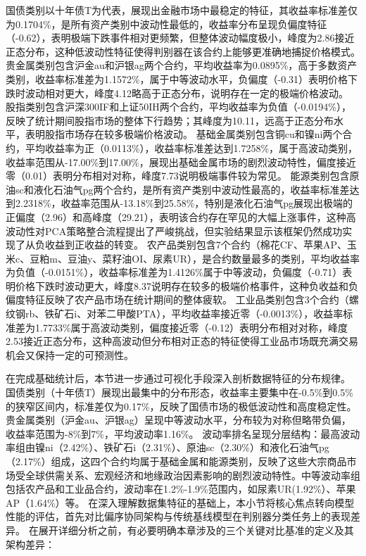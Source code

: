 国债类别以十年债T为代表，展现出金融市场中最稳定的特征，其收益率标准差仅为0.1704\%，是所有资产类别中波动性最低的，收益率分布呈现负偏度特征（-0.62），表明极端下跌事件相对更频繁，但整体波动幅度极小，峰度为2.86接近正态分布，这种低波动性特征使得判别器在该合约上能够更准确地捕捉价格模式。
贵金属类别包含沪金au和沪银ag两个合约，平均收益率为0.0895\%，高于多数资产类别，收益率标准差为1.1572\%，属于中等波动水平，负偏度（-0.31）表明价格下跌时波动相对更大，峰度4.12略高于正态分布，说明存在一定的极端价格波动。
股指类别包含沪深300IF和上证50IH两个合约，平均收益率为负值（-0.0194\%），反映了统计期间股指市场的整体下行趋势；其峰度为10.11，远高于正态分布水平，表明股指市场存在较多极端价格波动。
基础金属类别包含铜cu和镍ni两个合约，平均收益率为正（0.0113\%），收益率标准差达到1.7258\%，属于高波动类别，收益率范围从-17.00\%到17.00\%，展现出基础金属市场的剧烈波动特性，偏度接近零（0.01）表明分布相对对称，峰度7.73说明极端事件较为常见。
能源类别包含原油sc和液化石油气pg两个合约，是所有资产类别中波动性最高的，收益率标准差达到2.2318\%，收益率范围从-13.18\%到25.58\%，特别是液化石油气pg展现出极端的正偏度（2.96）和高峰度（29.21），表明该合约存在罕见的大幅上涨事件，这种高波动性对PCA策略整合流程提出了严峻挑战，但实验结果显示该框架仍然成功实现了从负收益到正收益的转变。
农产品类别包含7个合约（棉花CF、苹果AP、玉米c、豆粕m、豆油y、菜籽油OI、尿素UR），是合约数量最多的类别，平均收益率为负值（-0.0151\%），收益率标准差为1.4126\%属于中等波动，负偏度（-0.71）表明价格下跌时波动更大，峰度8.37说明存在较多的极端价格事件，这种负收益和负偏度特征反映了农产品市场在统计期间的整体疲软。
工业品类别包含3个合约（螺纹钢rb、铁矿石i、对苯二甲酸PTA），平均收益率接近零（-0.0013\%），收益率标准差为1.7733\%属于高波动类别，偏度接近零（-0.12）表明分布相对对称，峰度2.53接近正态分布，这种高波动但分布相对正态的特征使得工业品市场既充满交易机会又保持一定的可预测性。

在完成基础统计后，本节进一步通过可视化手段深入剖析数据特征的分布规律。
国债类别（十年债T）展现出最集中的分布形态，收益率主要集中在-0.5\%到0.5\%的狭窄区间内，标准差仅为0.17\%，反映了国债市场的极低波动性和高度稳定性。贵金属类别（沪金au、沪银ag）呈现中等波动水平，分布较为对称但略带负偏，收益率范围为-8\%到7\%，平均波动率1.16\%。
波动率排名呈现分层结构：最高波动率组由镍ni（2.42\%）、铁矿石i（2.31\%）、原油sc（2.30\%）和液化石油气pg（2.17\%）组成，这四个合约均属于基础金属和能源类别，反映了这些大宗商品市场受全球供需关系、宏观经济和地缘政治因素影响的剧烈波动特性。中等波动率组包括农产品和工业品合约，波动率在1.2\%-1.9\%范围内，如尿素UR(1.92\%）、苹果AP（1.64\%）等。
在深入理解数据集特征的基础上，本小节将核心焦点转向模型性能的评估，首先对比偏序协同架构与传统基线模型在判别器分类任务上的表现差异。
在展开详细分析之前，有必要明确本章涉及的三个关键对比基准的定义及其架构差异：

